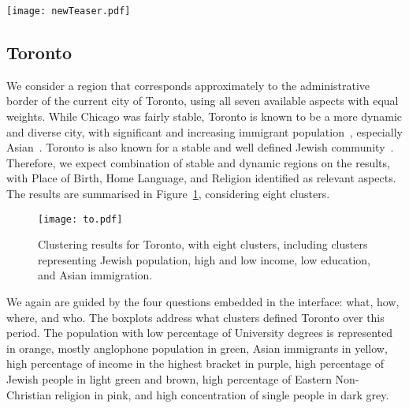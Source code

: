 \begin{figure*}
    \centering
 \texttt{[image: newTeaser.pdf]}
 \caption{Workflow to discover gentrification in Chicago: the purple cluster
 corresponds to high education / income. Its population is increasing over time,
 absorbing from the majority White cluster (orange). By selecting the purple
 cluster in 2010, the region is highlighted in the maps. The proportion of
 people with 4+ years of college is increasing in the whole city (grey IQRs),
 but significantly more in this region (black).\label{fig:chiWorkflow}}
\end{figure*}



\subsection{Toronto}

We consider a region that corresponds approximately to the administrative border
of the current city of Toronto, using all seven available aspects with equal
weights. While Chicago was fairly stable, Toronto is known to be a more dynamic
and diverse city, with significant and increasing immigrant
population~\citep{hulchanski2007three,Fong2011}, especially
Asian~\citep{Fong2003}. Toronto is also known for a stable and well defined
Jewish community~\citep{Harold2018, Fong2011}. Therefore, we expect 
combination of stable and dynamic regions on the results, with Place of Birth,
Home Language, and Religion identified as relevant aspects. The results are
summarised in Figure~\ref{fig:to}, considering eight clusters.

\begin{figure}
    \centering 
    \texttt{[image: to.pdf]}
    \caption{Clustering results for Toronto, with eight clusters, including
    clusters representing Jewish population, high and low income, low education,
    and Asian immigration.\label{fig:to}}
\end{figure}

We again are guided by the four questions embedded in the interface: what, how,
where, and who. The boxplots address what clusters defined Toronto over this
period. The population with low percentage of University degrees is represented
in orange, mostly anglophone population in green, Asian immigrants in yellow,
high percentage of income in the highest bracket in purple, high percentage of
Jewish people in light green and brown, high percentage of Eastern Non-Christian
religion in pink, and high concentration of single people in dark grey. 

